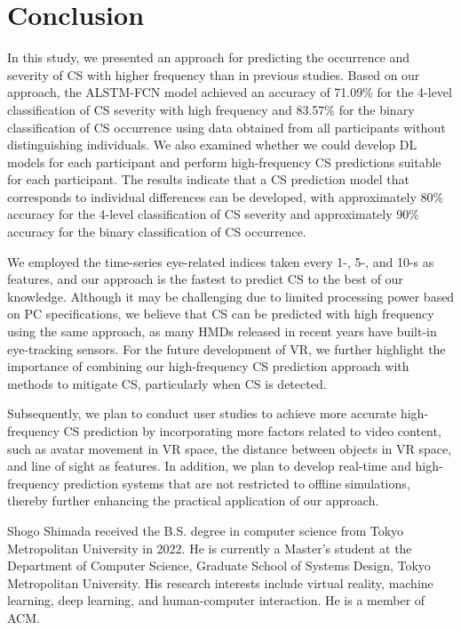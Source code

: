\documentclass{ieeeaccess}
\begin{document}
\section{Conclusion}
In this study, we presented an approach for predicting the occurrence and severity of CS with higher frequency than in previous studies. Based on our approach, the ALSTM-FCN model achieved an accuracy of 71.09\% for the 4-level classification of CS severity with high frequency and 83.57\% for the binary classification of CS occurrence using data obtained from all participants without distinguishing individuals. We also examined whether we could develop DL models for each participant and perform high-frequency CS predictions suitable for each participant. The results indicate that a CS prediction model that corresponds to individual differences can be developed, with approximately 80\% accuracy for the 4-level classification of CS severity and approximately 90\% accuracy for the binary classification of CS occurrence. 

We employed the time-series eye-related indices taken every 1-, 5-, and 10-s as features, and our approach is the fastest to predict CS to the best of our knowledge. Although it may be challenging due to limited processing power based on PC specifications, we believe that CS can be predicted with high frequency using the same approach, as many HMDs released in recent years have built-in eye-tracking sensors. For the future development of VR, we further highlight the importance of combining our high-frequency CS prediction approach with methods to mitigate CS, particularly when CS is detected. 

Subsequently, we plan to conduct user studies to achieve more accurate high-frequency CS prediction by incorporating more factors related to video content, such as avatar movement in VR space, the distance between objects in VR space, and line of sight as features. In addition, we plan to develop real-time and high-frequency prediction systems that are not restricted to offline simulations, thereby further enhancing the practical application of our approach.




\begin{IEEEbiography}{Shogo Shimada} received the B.S. degree in computer science from Tokyo Metropolitan University in 2022. He is currently a Master's student at the Department of Computer Science, Graduate School of Systems Design, Tokyo Metropolitan University. His research interests include virtual reality, machine learning, deep learning, and human-computer interaction. He is a member of ACM.
\end{IEEEbiography}
\end{document}
